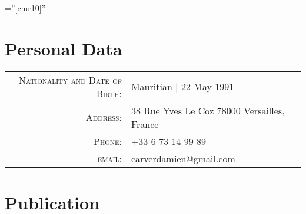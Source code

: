 \documentclass[a4paper,10pt]{article} %
\begin{document}
\pagestyle{empty} %

\font\fb=''[cmr10]'' %


\par{\bigskip\par}

\section{Personal Data}

\begin{tabular}{rl}
	\textsc{Nationality and Date of Birth:} & Mauritian  | 22 May 1991 \\
	\textsc{Address:} & 38 Rue Yves Le Coz 78000 Versailles, France\\
	\textsc{Phone:} & +33 6 73 14 99 89\\
	\textsc{email:} & \href{carverdamien@gmail.com}{carverdamien@gmail.com}
\end{tabular}


\section{Publication}
\end{document}
